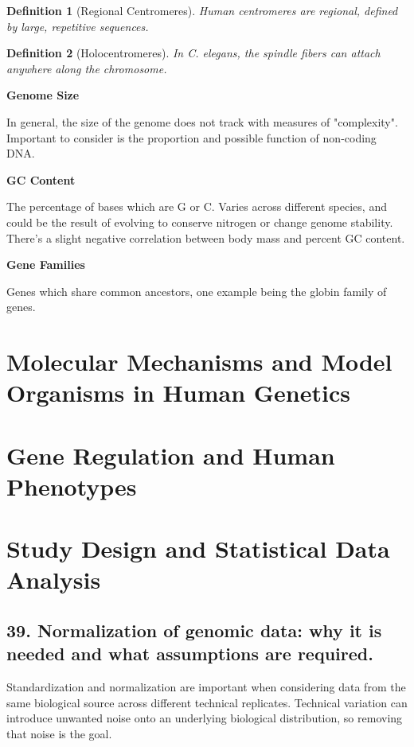 \documentclass{tufte-handout}
\theoremstyle{noparens}
\newtheorem*{define}{Definition}
\begin{document}
\begin{define}[Regional Centromeres]
Human centromeres are regional, defined by large, repetitive sequences.
\end{define}

\begin{define}[Holocentromeres]
In \emph{C. elegans}, the spindle fibers can attach anywhere along the chromosome.
\end{define}

\textbf{Genome Size}

In general, the size of the genome does not track with measures of "complexity". Important to consider is the proportion and possible function of non-coding DNA.

\textbf{GC Content}

The percentage of bases which are G or C. Varies across different species, and could be the result of evolving to conserve nitrogen or change genome stability. There's a slight negative correlation between body mass and percent GC content.

\textbf{Gene Families}

Genes which share common ancestors, one example being the globin family of genes.

\section{Molecular Mechanisms and Model Organisms in Human Genetics}\label{sec:molecmech}

\section{Gene Regulation and Human Phenotypes}\label{sec:genreg}

\section{Study Design and Statistical Data Analysis}\label{sec:stats}

\subsection{39. 
Normalization of genomic data: why it is needed and what assumptions are required.
}

Standardization and normalization are important when considering data from the same biological source across different technical replicates. Technical variation can introduce unwanted noise onto an underlying biological distribution, so removing that noise is the goal.
\end{document}

